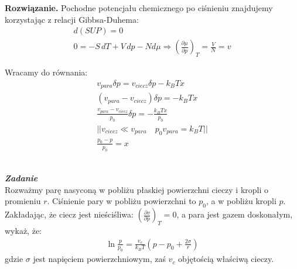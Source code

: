 \documentclass[11pt,a4paper]{article}
\newcounter{zadanie}\newcommand{\zadanie}[1][]{\addtocounter{zadanie}{1} ~\\ {\bf \emph{Zadanie \arabic{zadanie} #1 }} \\}
\newenvironment{solution}{\vspace{1cm} \par\textbf{Rozwiązanie.} \vspace{1cm}}{}
\begin{document}
\begin{solution}
Pochodne potencjału chemicznego po ciśnieniu znajdujemy korzystając z 
relacji Gibbsa-Duhema:
\begin{align*}
  d(SUP) = 0 \\
  0 = -S\,dT + V\,dp - Nd \mu \Rightarrow \left( \frac{\partial \mu}{\partial p} \right)_{T} = \frac{V}{N} = v
\end{align*}

Wracamy do równania:
\begin{align*}
v_{para} \delta p = v_{ciecz} \delta p - k_B T x \\
(v_{para} - v_{ciecz}) \delta p = - k_B T x \\
\frac{v_{para} - v_{ciecz}}{p_{0}} \delta p = - \frac{k_B T x}{p_0} \\
|| v_{ciecz} \ll v_{para} \quad p_0 v_{para} = k_B T || \\
\frac{p_0 - p}{p_0} = x
\end{align*}



\newpage 
\end{solution}
\zadanie[]

Rozważmy parę nasyconą w pobliżu płaskiej powierzchni cieczy i kropli o promieniu $r$.
Ciśnienie pary w pobliżu powierzchni to $p_0$, 
a w pobliżu kropli $p$. Zakładając, że ciecz jest nieściśliwa: 
$\left(\frac{\partial v}{\partial p}\right)_T = 0$,
a para jest gazem doskonałym, wykaż, że:
\begin{align*}
\ln\frac{p}{p_0} = \frac{v_c}{k_BT}\left(p - p_0 + \frac{2\sigma}{r}\right)
\end{align*}
gdzie $\sigma$ jest napięciem powierzchniowym, zaś $v_c$ objętością właściwą cieczy.
\end{document}
